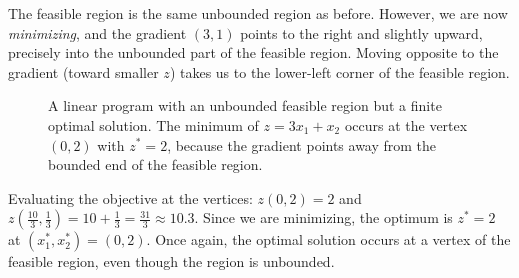 \begin{solution}
The feasible region is the same unbounded region as before. However, we are now \emph{minimizing}, and the gradient $(3,1)$ points to the right and slightly upward, precisely into the unbounded part of the feasible region. Moving opposite to the gradient (toward smaller $z$) takes us to the lower-left corner of the feasible region.

\begin{figure}[H]
\centering
{}
\caption{A linear program with an unbounded feasible region but a finite optimal solution. The minimum of $z = 3x_1+x_2$ occurs at the vertex $(0,2)$ with $z^* = 2$, because the gradient points away from the bounded end of the feasible region.}
\label{fig:LPUnboundFeasibleRegion2}
\end{figure}

Evaluating the objective at the vertices: $z(0,2) = 2$ and $z(\tfrac{10}{3},\tfrac{1}{3}) = 10 + \tfrac{1}{3} = \tfrac{31}{3} \approx 10.3$. Since we are minimizing, the optimum is $z^* = 2$ at $(x_1^*,x_2^*) = (0,2)$. Once again, the optimal solution occurs at a vertex of the feasible region, even though the region is unbounded.
\label{ex:LPUnboundFeasibleRegion2}
\end{solution}

